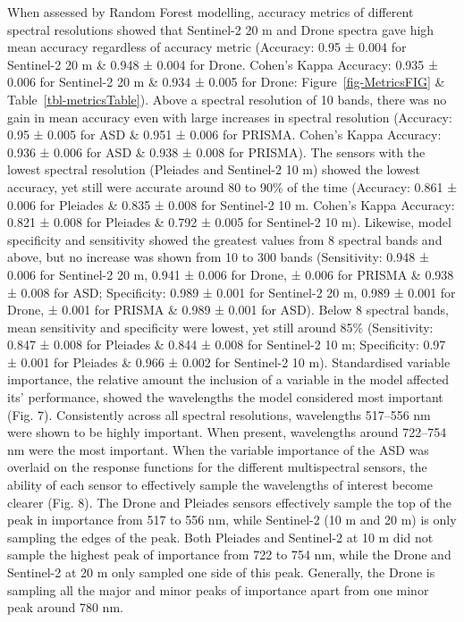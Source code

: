 \documentclass[
  letterpaper,
  11pt,
  english,
  singlespacing,
  headsepline]{MastersDoctoralThesis}
\begin{document}
\begin{spacing}{1.5}
When assessed by Random Forest modelling, accuracy metrics of different
spectral resolutions showed that Sentinel-2 20 m and Drone spectra gave
high mean accuracy regardless of accuracy metric (Accuracy: 0.95 ± 0.004
for Sentinel-2 20 m \& 0.948 ± 0.004 for Drone. Cohen's Kappa Accuracy:
0.935 ± 0.006 for Sentinel-2 20 m \& 0.934 ± 0.005 for Drone:
Figure~\ref{fig-MetricsFIG} \& Table~\ref{tbl-metricsTable}). Above a
spectral resolution of 10 bands, there was no gain in mean accuracy even
with large increases in spectral resolution (Accuracy: 0.95 ± 0.005 for
ASD \& 0.951 ± 0.006 for PRISMA. Cohen's Kappa Accuracy: 0.936 ± 0.006
for ASD \& 0.938 ± 0.008 for PRISMA). The sensors with the lowest
spectral resolution (Pleiades and Sentinel-2 10 m) showed the lowest
accuracy, yet still were accurate around 80 to 90\% of the time
(Accuracy: 0.861 ± 0.006 for Pleiades \& 0.835 ± 0.008 for Sentinel-2 10
m. Cohen's Kappa Accuracy: 0.821 ± 0.008 for Pleiades \& 0.792 ± 0.005
for Sentinel-2 10 m). Likewise, model specificity and sensitivity showed
the greatest values from 8 spectral bands and above, but no increase was
shown from 10 to 300 bands (Sensitivity: 0.948 ± 0.006 for Sentinel-2 20
m, 0.941 ± 0.006 for Drone, ± 0.006 for PRISMA \& 0.938 ± 0.008 for ASD;
Specificity: 0.989 ± 0.001 for Sentinel-2 20 m, 0.989 ± 0.001 for Drone,
± 0.001 for PRISMA \& 0.989 ± 0.001 for ASD). Below 8 spectral bands,
mean sensitivity and specificity were lowest, yet still around 85\%
(Sensitivity: 0.847 ± 0.008 for Pleiades \& 0.844 ± 0.008 for Sentinel-2
10 m; Specificity: 0.97 ± 0.001 for Pleiades \& 0.966 ± 0.002 for
Sentinel-2 10 m). Standardised variable importance, the relative amount
the inclusion of a variable in the model affected its' performance,
showed the wavelengths the model considered most important (Fig. 7).
Consistently across all spectral resolutions, wavelengths 517--556 nm
were shown to be highly important. When present, wavelengths around
722--754 nm were the most important. When the variable importance of the
ASD was overlaid on the response functions for the different
multispectral sensors, the ability of each sensor to effectively sample
the wavelengths of interest become clearer (Fig. 8). The Drone and
Pleiades sensors effectively sample the top of the peak in importance
from 517 to 556 nm, while Sentinel-2 (10 m and 20 m) is only sampling
the edges of the peak. Both Pleiades and Sentinel-2 at 10 m did not
sample the highest peak of importance from 722 to 754 nm, while the
Drone and Sentinel-2 at 20 m only sampled one side of this peak.
Generally, the Drone is sampling all the major and minor peaks of
importance apart from one minor peak around 780 nm.


\end{spacing}
\end{document}

